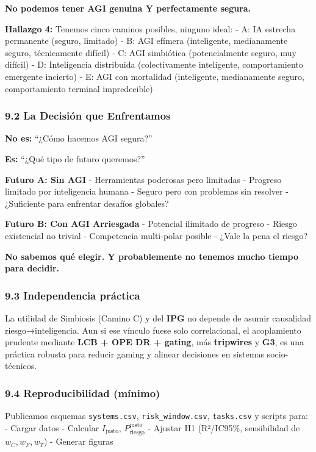 \textbf{No podemos tener AGI genuina Y perfectamente segura.}

\textbf{Hallazgo 4:} Tenemos cinco caminos posibles, ninguno ideal: - A:
IA estrecha permanente (seguro, limitado) - B: AGI efímera (inteligente,
medianamente seguro, técnicamente difícil) - C: AGI simbiótica
(potencialmente seguro, muy difícil) - D: Inteligencia distribuida
(colectivamente inteligente, comportamiento emergente incierto) - E: AGI
con mortalidad (inteligente, medianamente seguro, comportamiento
terminal impredecible)

\subsubsection{9.2 La Decisión que
Enfrentamos}\label{la-decisiuxf3n-que-enfrentamos}

\textbf{No es:} ``¿Cómo hacemos AGI segura?''

\textbf{Es:} ``¿Qué tipo de futuro queremos?''

\textbf{Futuro A: Sin AGI} - Herramientas poderosas pero limitadas -
Progreso limitado por inteligencia humana - Seguro pero con problemas
sin resolver - ¿Suficiente para enfrentar desafíos globales?

\textbf{Futuro B: Con AGI Arriesgada} - Potencial ilimitado de progreso
- Riesgo existencial no trivial - Competencia multi-polar posible -
¿Vale la pena el riesgo?

\textbf{No sabemos qué elegir. Y probablemente no tenemos mucho tiempo
para decidir.}

\subsubsection{9.3 Independencia
práctica}\label{independencia-pruxe1ctica}

La utilidad de Simbiosis (Camino C) y del \textbf{IPG} no depende de
asumir causalidad riesgo→inteligencia. Aun si ese vínculo fuese solo
correlacional, el acoplamiento prudente mediante \textbf{LCB + OPE DR +
gating}, más \textbf{tripwires} y \textbf{G3}, es una práctica robusta
para reducir gaming y alinear decisiones en sistemas socio-técnicos.

\subsubsection{9.4 Reproducibilidad
(mínimo)}\label{reproducibilidad-muxednimo}

Publicamos esquemas \texttt{systems.csv}, \texttt{risk\_window.csv},
\texttt{tasks.csv} y scripts para: - Cargar datos - Calcular
\(I_{\text{justo}}\), \(P_{\text{riesgo}}^{\text{justo}}\) - Ajustar H1
(R²/IC95\%, sensibilidad de \(w_C,w_F,w_T\)) - Generar figuras

